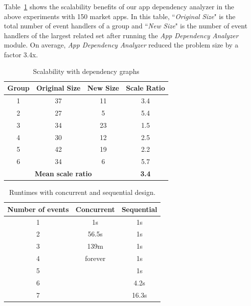Table~\ref{scalability} shows the scalability benefits of our app dependency analyzer in the above experiments with 150 market apps.
In this table,
``\textit{Original Size}" is the total number of event handlers of a group and
``\textit{New Size}" is the number of event handlers of the largest related set after running the \textit{App Dependency Analyzer} module.
On average, \textit{App Dependency Analyzer} reduced the problem size by a factor 3.4x.


\begin{table}[t]
\ssp
\scriptsize
    \caption{Scalability with dependency graphs}
    \centering
        \label{scalability}
		{
		\begin{tabular}{| c | c | c | c |}
		\hline
		\bf Group & \bf Original Size & \bf New Size & \bf Scale Ratio\\
		\hline
		1 & 37 & 11 & 3.4\\
		\hline
		2 & 27 & 5 & 5.4\\
		\hline
		3 & 34 & 23 & 1.5\\
		\hline
		4 & 30 & 12 & 2.5\\
		\hline
		5 & 42 & 19 & 2.2\\
		\hline
		6 & 34 & 6 & 5.7\\
		\hline
		\multicolumn{3}{|c|}{\textbf{Mean scale ratio}} & \textbf{3.4}\\
		\hline
		\end{tabular}
		}
\end{table}

\begin{table}[t]
\ssp
\scriptsize
    \caption{Runtimes with concurrent and sequential design.}
		\centering
        \label{designruntime}
		{
		\begin{tabular}{| c | c | c |}
		\hline
		\bf Number of events & \bf Concurrent & \bf Sequential\\
		\hline
		1 & 1s &  1s\\
		\hline
		2 & 56.5s & 1s\\
		\hline
		3 & 139m & 1s\\
		\hline
		4 & forever &  1s\\
		\hline
		5 &  &  1s\\
		\hline
		6 &  &  4.2s\\
		\hline
		7 &  &  16.3s\\
		\hline
		\end{tabular}
		}
\end{table}


